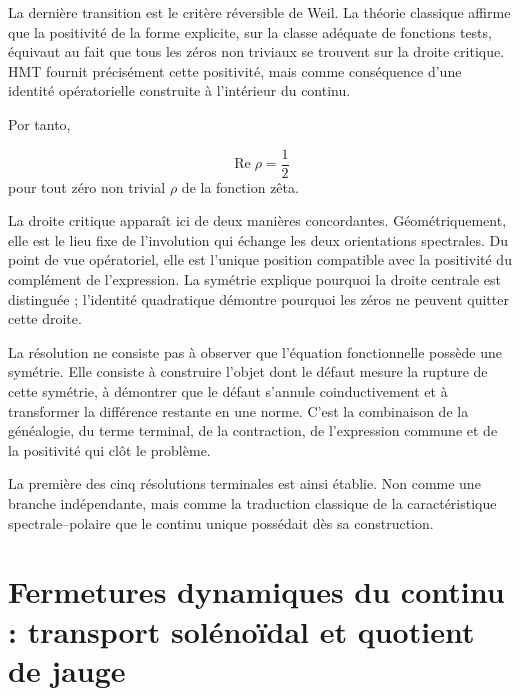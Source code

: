La dernière transition est le critère réversible de Weil. La théorie classique affirme que la positivité de la forme explicite, sur la classe adéquate de fonctions tests, équivaut au fait que tous les zéros non triviaux se trouvent sur la droite critique. HMT fournit précisément cette positivité, mais comme conséquence d’une identité opératorielle construite à l’intérieur du continu.\par
{}
Por tanto,\par
\[
\operatorname{Re}\rho=\frac12
\]
pour tout zéro non trivial \(\rho\) de la fonction zêta.\par
La droite critique apparaît ici de deux manières concordantes. Géométriquement, elle est le lieu fixe de l’involution qui échange les deux orientations spectrales. Du point de vue opératoriel, elle est l’unique position compatible avec la positivité du complément de l’expression. La symétrie explique pourquoi la droite centrale est distinguée ; l’identité quadratique démontre pourquoi les zéros ne peuvent quitter cette droite.\par
La résolution ne consiste pas à observer que l’équation fonctionnelle possède une symétrie. Elle consiste à construire l’objet dont le défaut mesure la rupture de cette symétrie, à démontrer que le défaut s’annule coinductivement et à transformer la différence restante en une norme. C’est la combinaison de la généalogie, du terme terminal, de la contraction, de l’expression commune et de la positivité qui clôt le problème.\par
La première des cinq résolutions terminales est ainsi établie. Non comme une branche indépendante, mais comme la traduction classique de la caractéristique spectrale–polaire que le continu unique possédait dès sa construction.\par

\section{Fermetures dynamiques du continu : transport solénoïdal et quotient de jauge}
